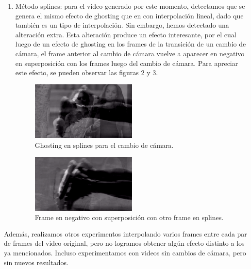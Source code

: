 \begin{enumerate}
\item M\'etodo splines: para el video generado por este momento, detectamos que se genera el mismo efecto de ghosting que en con interpolaci\'on lineal, dado que tambi\'en es un tipo de interpolaci\'on. Sin embargo, hemos detectado una alteraci\'on extra. Esta alteraci\'on produce un efecto interesante, por el cual luego de un efecto de ghosting en los frames de la transici\'on de un cambio de c\'amara, el frame anterior al cambio de c\'amara vuelve a aparecer en negativo en superposici\'on con los frames luego del cambio de c\'amara. Para apreciar este efecto, se pueden observar las figuras 2 y 3.

\begin{figure}[H]
  \centering
    \includegraphics[width=0.5\textwidth]{img/ghosting_splines_1.png}
  	\caption{Ghosting en splines para el cambio de c\'amara.}
\end{figure}

\begin{figure}[H]
  \centering
    \includegraphics[width=0.5\textwidth]{img/ghosting_negative.png}
  	\caption{Frame en negativo con superposici\'on con otro frame en splines.}
\end{figure}

\end{enumerate}

Adem\'as, realizamos otros experimentos interpolando varios frames entre cada par de frames del video original, pero no logramos obtener alg\'un efecto distinto a los ya mencionados. Incluso experimentamos con videos sin cambios de c\'amara, pero sin nuevos resultados.
